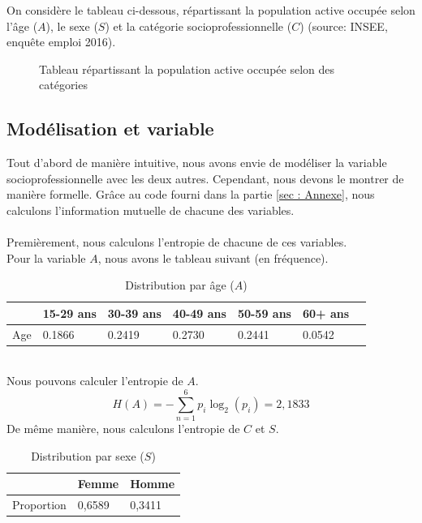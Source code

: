 \documentclass{article}
\begin{document}
On considère le tableau ci-dessous, répartissant la population active occupée selon l'âge ($A$), le sexe ($S$) et la
catégorie socioprofessionnelle ($C$) (source: INSEE, enquête emploi 2016).
\begin{figure}[ht]
  \centering
  \setlength{\fboxsep}{0pt}  %
  \setlength{\fboxrule}{1pt}  %
  \caption{Tableau répartissant la population active occupée selon des catégories }
\end{figure}
\subsection{Modélisation et variable}
\label{1.1}
Tout d'abord de manière intuitive, nous avons envie de modéliser la variable
socioprofessionnelle avec les deux autres. Cependant, nous devons
le montrer de manière formelle. Grâce au code fourni dans la partie \ref{sec : Annexe},
nous calculons l'information mutuelle de chacune des variables.\\\\
Premièrement, nous calculons l'entropie de chacune de ces variables.\\
Pour la variable $A$, nous avons le tableau suivant (en fréquence). 
\begin{table}[ht]
  \centering
  \begin{tabular}{|l|l|l|l|l|l|l|}
    \hline
    & 15-29 ans  & 30-39 ans  & 40-49 ans  & 50-59 ans  & 60+ ans \\ \hline
    Age & 0.1866 & 0.2419 & 0.2730 & 0.2441 & 0.0542 \\ \hline
  \end{tabular}
  \caption{Distribution par âge ($A$)}
\end{table}
\\Nous pouvons calculer l'entropie de $A$.\\
\[
H(A) = -\sum_{n = 1}^{6}p_i\log_2(p_i)=2,1833
\]
De même manière, nous calculons l'entropie de $C$ et $S$.\\
\begin{table}[H]
  \centering
  \begin{tabular}{|l|l|l|}
  \hline
             & Femme  & Homme  \\ \hline
  Proportion & 0,6589 & 0,3411 \\ \hline
  \end{tabular}
  \caption{Distribution par sexe ($S$)}
\end{table}
\end{document}
